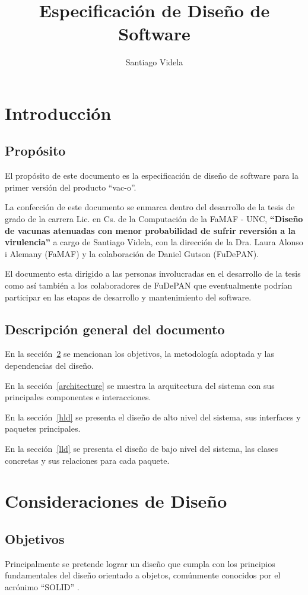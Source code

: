 \documentclass[a4paper,10pt]{article}
\author{Santiago Videla}
\title{Especificaci\'on de Dise\~no de Software}
\begin{document}
\maketitle
\newpage
\tableofcontents
\newpage
\section{Introducci\'on}
  \subsection{Prop\'osito}
  El prop\'osito de este documento es la especificaci\'on de
dise\~no de software para la primer versi\'on del producto ``vac-o''.

  La confecci\'on de este documento se enmarca dentro del desarrollo de la tesis
de grado de la carrera Lic. en Cs. de la Computaci\'on de la FaMAF - UNC,
\textbf{``Dise\~no de vacunas atenuadas con menor probabilidad de sufrir
reversi\'on a la virulencia''} a cargo de Santiago Videla, con la direcci\'on
de la Dra. Laura Alonso i Alemany (FaMAF) y la colaboraci\'on de Daniel
Gutson (FuDePAN).

  El documento esta dirigido a las personas involucradas en el desarrollo de la
tesis como as\'i tambi\'en a los colaboradores de FuDePAN que eventualmente
podr\'ian participar en las etapas de desarrollo y mantenimiento del software.

  \subsection{Descripci\'on general del documento}
  En la secci\'on~\ref{considerations} se mencionan los objetivos, la
metodolog\'ia adoptada y las dependencias del dise\~no.

  En la secci\'on~\ref{architecture} se muestra la arquitectura del
sistema con sus principales componentes e interacciones.

  En la secci\'on~\ref{hld} se presenta el dise\~no de alto nivel del sistema,
sus interfaces y paquetes principales.

  En la secci\'on~\ref{lld} se presenta el dise\~no de bajo nivel del sistema,
las clases concretas y sus relaciones para cada paquete.

\section{Consideraciones de Dise\~no}
  \label{considerations}
  \subsection{Objetivos}
  Principalmente se pretende lograr un dise\~no que cumpla con los principios
fundamentales del dise\~no orientado a objetos, com\'unmente conocidos por el
acr\'onimo ``SOLID'' \cite{martin00}.
\end{document}
